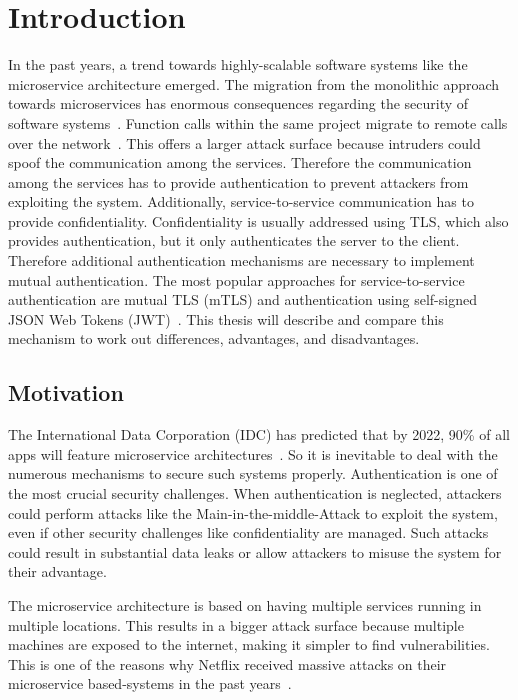 \chapter{Introduction}
\label{cha:Introduction}
In the past years, a trend towards highly-scalable software systems like the microservice architecture emerged.
The migration from the monolithic approach towards microservices has enormous consequences regarding the security of software systems~\cite{shmeleva2020microservices}. 
Function calls within the same project migrate to remote calls over the network~\cite{chandramouli2019microservices}. 
This offers a larger attack surface because intruders could spoof the communication among the services.
Therefore the communication among the services has to provide authentication to prevent attackers from exploiting the system.
Additionally, service-to-service communication has to provide confidentiality.
Confidentiality is usually addressed using TLS, which also provides authentication, but it only authenticates the server to the client.
Therefore additional authentication mechanisms are necessary to implement mutual authentication.
The most popular approaches for service-to-service authentication are mutual TLS (mTLS) and authentication using self-signed JSON Web Tokens (JWT)~\cite{dias2020microservices}.
This thesis will describe and compare this mechanism to work out differences, advantages, and disadvantages.

\section{Motivation}
The International Data Corporation (IDC) has predicted that by 2022, 90\% of all apps will feature microservice architectures~\cite{idcprediction2019}. 
So it is inevitable to deal with the numerous mechanisms to secure such systems properly. 
Authentication is one of the most crucial security challenges.
When authentication is neglected, attackers could perform attacks like the Main-in-the-middle-Attack to exploit the system, even if other security challenges like confidentiality are managed.
Such attacks could result in substantial data leaks or allow attackers to misuse the system for their advantage.

The microservice architecture is based on having multiple services running in multiple locations.
This results in a bigger attack surface because multiple machines are exposed to the internet, making it simpler to find vulnerabilities.
This is one of the reasons why Netflix received massive attacks on their microservice based-systems in the past years~\cite{pereira2019security}.

